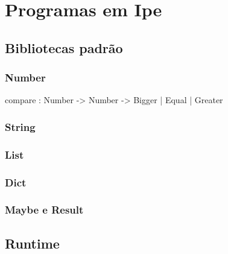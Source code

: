 
\chapter{Programas em Ipe}


\section{Bibliotecas padrão}
\subsection{Number}
compare : Number -> Number -> Bigger | Equal | Greater
\subsection{String}
\subsection{List}
\subsection{Dict}
\subsection{Maybe e Result}

\section{Runtime}
